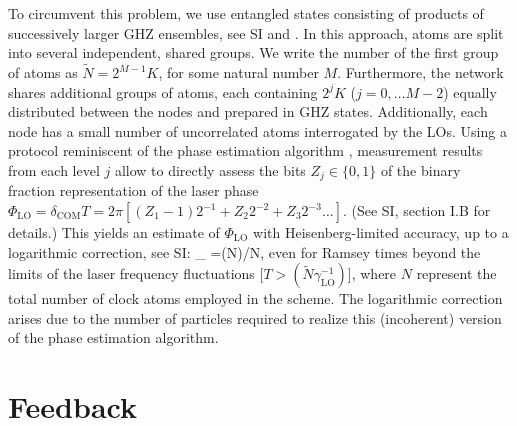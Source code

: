 To circumvent this problem, we use entangled states consisting of products of
successively larger GHZ ensembles, see SI and 
\cite{Kessler2014}. In this approach, 
atoms are split into
several independent, shared groups.
We write the number of the first group of atoms as $\tilde N =2^{M-1} K$, for
some natural number $M$.
Furthermore, the network shares additional groups of atoms, each containing
$2^{j} K$ ($j=0, \hdots M-2$) equally distributed between the nodes and prepared
in GHZ states. 
Additionally, each node has a small number of uncorrelated atoms interrogated by
the LOs. Using a protocol reminiscent of the phase estimation algorithm
\cite{Kessler2014,Nielsen_Chuang, Giedke2006}, measurement results from each
level $j$ allow to directly assess the bits $Z_j \in \{0,1\}$ of the binary
fraction representation of the laser phase $\Phi_\mathrm{LO}=\delta_\mathrm{COM} T
=2\pi [(Z_1-1) 2^{-1} + Z_2 2^{-2} + Z_3 2^{-3} \hdots]$.
(See SI, section I.B for details.)
This
yields an estimate of $\Phi_\mathrm{LO}$ with Heisenberg-limited accuracy, up to a
logarithmic correction, see SI:
\bel 
	\Delta \Phi_ =\log(N)/N,
	\label{eq2}
\eel 
even for Ramsey times beyond the limits of the laser frequency fluctuations [$T
> (\tilde N\gamma_\mathrm{LO}^{-1})$], where $N$ represent the total number of
clock atoms employed in the scheme. The logarithmic correction arises due to the
number of particles required to realize this (incoherent) version of the phase
estimation algorithm.

\section{Feedback}

